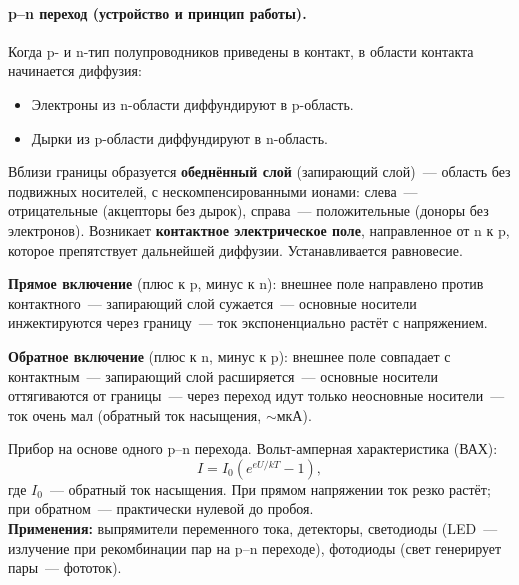 \documentclass[12pt]{article}
\begin{document}
\paragraph{p--n переход (устройство и принцип работы).}

Когда p- и n-тип полупроводников приведены в контакт, в области контакта начинается диффузия:
\begin{itemize}
	\item Электроны из n-области диффундируют в p-область.
	\item Дырки из p-области диффундируют в n-область.
\end{itemize}
Вблизи границы образуется \textbf{обеднённый слой} (запирающий слой)~--- область без подвижных носителей, с нескомпенсированными ионами: слева~--- отрицательные (акцепторы без дырок), справа~--- положительные (доноры без электронов). Возникает \textbf{контактное электрическое поле}, направленное от n к p, которое препятствует дальнейшей диффузии. Устанавливается равновесие.

\textbf{Прямое включение} (плюс к p, минус к n): внешнее поле направлено против контактного~--- запирающий слой сужается~--- основные носители инжектируются через границу~--- ток экспоненциально растёт с напряжением.

\textbf{Обратное включение} (плюс к n, минус к p): внешнее поле совпадает с контактным~--- запирающий слой расширяется~--- основные носители оттягиваются от границы~--- через переход идут только неосновные носители~--- ток очень мал (обратный ток насыщения, $\sim$мкА).

\begin{definition}
	Прибор на основе одного p--n перехода. Вольт-амперная характеристика (ВАХ):
	\[
		I = I_0\left(e^{eU/kT} - 1\right),
	\]
	где $I_0$~--- обратный ток насыщения. При прямом напряжении ток резко растёт; при обратном~--- практически нулевой до пробоя.\\
	\textbf{Применения:} выпрямители переменного тока, детекторы, светодиоды (LED~--- излучение при рекомбинации пар на p--n переходе), фотодиоды (свет генерирует пары~--- фототок).
\end{definition}
\end{document}
